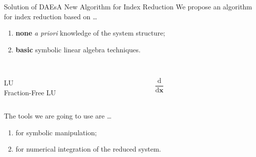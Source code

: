\begin{frame}{Solution of \aclp{DAE}}{A New Algorithm for Index Reduction}
  We propose an algorithm for index reduction based on \dots
  \begin{enumerate}
    \item \textbf{none} \emph{a priori} knowledge of the system structure;
    \item \textbf{basic} symbolic linear algebra techniques.
  \end{enumerate}
  \vspace{0.5em}
  \begin{columns}
    \centering
    \begin{column}[t]{0.45\textwidth}
      \centering
       \\
      LU \\ Fraction-Free LU
    \end{column}
    \begin{column}[t]{0.45\textwidth}
      \centering
       \\[0.25em]
      $\dfrac{\text{d}}{\text{d}\textbf{x}}$ \vspace*{0.15cm}
    \end{column}
  \end{columns}
  \vspace{0.5em}
  The tools we are going to use are \dots
  \begin{enumerate}
    \item \Maple{} for symbolic manipulation;
    \item \Matlab{} for numerical integration of the reduced system.
  \end{enumerate}
\end{frame}

